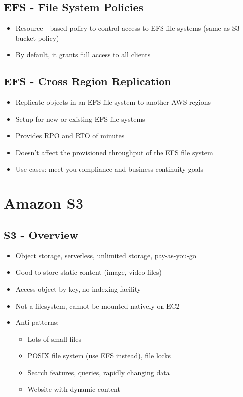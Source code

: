 \subsection{EFS - File System Policies}
\begin{itemize}
    \item Resource - based policy to control access to EFS file systems (same as S3 bucket policy)
    \item By default, it grants full access to all clients
\end{itemize}

\subsection{EFS - Cross Region Replication}
\begin{itemize}
    \item Replicate objects in an EFS file system to another AWS regions
    \item Setup for new or existing EFS file systems
    \item Provides RPO and RTO of minutes
    \item Doesn't affect the provisioned throughput of the EFS file system
    \item Use cases: meet you compliance and business continuity goals
\end{itemize}


\section{Amazon S3}

\subsection{S3 - Overview}
\begin{itemize}
    \item Object storage, serverless, unlimited storage, pay-as-you-go
    \item Good to store static content (image, video files)
    \item Access object by key, no indexing facility
    \item Not a filesystem, cannot be mounted natively on EC2

    \item Anti patterns:
    \begin{itemize}
        \item Lots of small files
        \item POSIX file system (use EFS instead), file locks
        \item Search features, queries, rapidly changing data
        \item Website with dynamic content
    \end{itemize}
\end{itemize}


